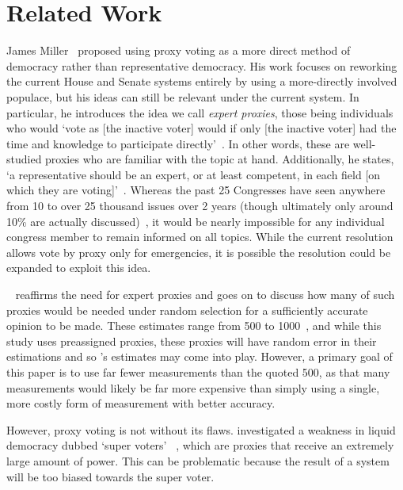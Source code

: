 \section{Related Work}\label{sec:related-work}
James Miller~\cite{Miller1969} proposed using proxy voting as a more direct
method of democracy rather than representative democracy.
His work focuses on reworking the current House and Senate systems entirely by using a
more-directly involved populace, but his ideas can still be relevant under the current
system.
In particular, he introduces the idea we call \textit{expert proxies},
those being individuals who would `vote as [the inactive voter] would if only
[the inactive voter] had the time and knowledge to participate
directly'~\cite[para.~1.3]{Miller1969}.
In other words, these are well-studied proxies who are familiar with the topic at hand.
Additionally, he states, `a representative should be an expert, or at least
competent, in each field [on which they are voting]'~\cite[para.~2.7]{Miller1969}.
Whereas the past 25 Congresses have seen anywhere from 10 to over 25 thousand issues
over 2 years (though ultimately only around 10\% are actually
discussed)~\cite{GovTrack2022}, it would be nearly impossible for any individual
congress member to remain informed on all topics.
While the current resolution allows vote by proxy only for emergencies, it is
possible the resolution could be expanded to exploit this idea.

~\cite{Mueller1972} reaffirms the need for expert proxies and
goes on to discuss how many of such proxies would be needed under random
selection for a sufficiently accurate opinion to be made.
These estimates range from 500 to 1000~\cite[para.~3.2]{Mueller1972}, and
while this study uses preassigned proxies, these proxies will have random
error in their estimations and so 's estimates may come into
play.
However, a primary goal of this paper is to use far fewer measurements than the
quoted 500, as that many measurements would likely be far more expensive than
simply using a single, more costly form of measurement with better accuracy.

However, proxy voting is not without its flaws.
 investigated a weakness in liquid democracy dubbed `super voters'
~\cite[para.~1.3]{Golz2021}, which are proxies that receive an extremely large
amount of power.
This can be problematic because the result of a system will be too biased
towards the super voter.  

